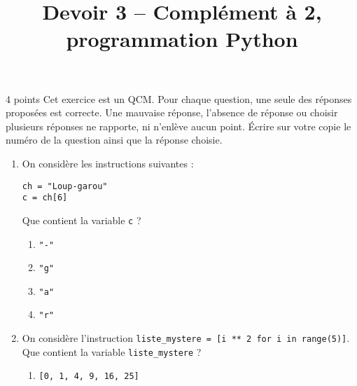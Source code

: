 \documentclass[a4paper,dvipsnames]{article}
\title{Devoir 3 -- Complément à 2, programmation Python}
\author{}
\date{}
\begin{document}
\renewcommand{\contentsname}{}

\pagestyle{fancy}

\begin{tcolorbox}[colframe=blue!75, colback=blue!45, valign=center, height=1.5cm, top=5mm]
  \maketitle
\end{tcolorbox}


\vspace{1cm}

\thispagestyle{fancy}

\begin{exercice}{4 points}{}
  Cet exercice est un QCM. Pour chaque question, une seule des réponses proposées est correcte. Une mauvaise réponse, l'absence de réponse ou choisir plusieurs réponses ne rapporte, ni n'enlève aucun point.
  Écrire sur votre copie le numéro de la question ainsi que la réponse choisie.
  \begin{enumerate}
    \item On considère les instructions suivantes :
      \begin{verbatim}
ch = "Loup-garou"
c = ch[6]
      \end{verbatim}
      Que contient la variable \texttt{c} ?
      \vspace*{-2mm}
      \begin{multicols}{4}
        \begin{enumerate}
	  \item \texttt{"-"}
	  \item \texttt{"g"}
	  \item \texttt{"a"}
	  \item \texttt{"r"}
        \end{enumerate}
      \end{multicols}
    \item On considère l'instruction \texttt{liste_mystere = [i ** 2 for i in range(5)]}. Que contient la variable \texttt{liste_mystere} ?
      \vspace*{-2mm}
      \begin{multicols}{2}
        \begin{enumerate}
	  \item \texttt{[0, 1, 4, 9, 16, 25]}

\end{enumerate}
\end{multicols}
\end{enumerate}
\end{exercice}
\end{document}
